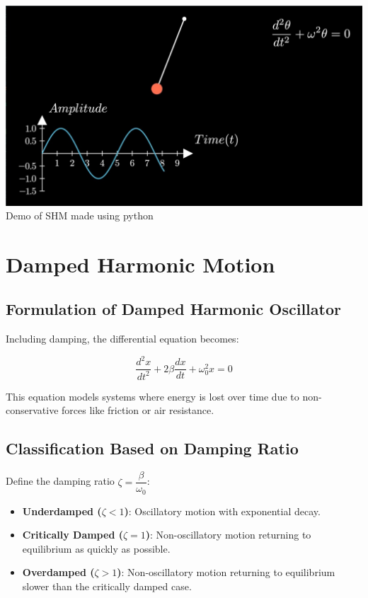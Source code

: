 \documentclass[12pt,a4paper]{article}
\begin{document}
\begin{center}
    \includegraphics[scale=0.2]{simple_shm}\\
    Demo of SHM made using python
\end{center}


\section{Damped Harmonic Motion}

\subsection{Formulation of Damped Harmonic Oscillator}

Including damping, the differential equation becomes:

\[
\frac{d^2 x}{dt^2} + 2\beta \frac{dx}{dt} + \omega_0^2 x = 0
\]

This equation models systems where energy is lost over time due to non-conservative forces like friction or air resistance.

\subsection{Classification Based on Damping Ratio}

Define the damping ratio \( \zeta = \dfrac{\beta}{\omega_0} \):

\begin{itemize}
    \item \textbf{Underdamped (\( \zeta < 1 \))}: Oscillatory motion with exponential decay.
    \item \textbf{Critically Damped (\( \zeta = 1 \))}: Non-oscillatory motion returning to equilibrium as quickly as possible.
    \item \textbf{Overdamped (\( \zeta > 1 \))}: Non-oscillatory motion returning to equilibrium slower than the critically damped case.
\end{itemize}
\end{document}
